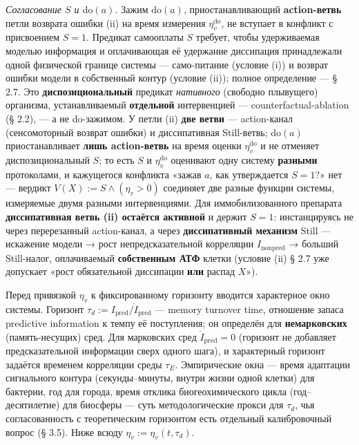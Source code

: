 \documentclass[pdflatex,sn-mathphys-ay]{sn-jnl}
\begin{document}
\emph{Согласование \(S\) и \(\mathrm{do}(a)\).} Зажим \(\mathrm{do}(a)\), приостанавливающий \textbf{action-ветвь} петли возврата ошибки (ii) на время измерения \(\eta_v^{\mathrm{do}}\), не вступает в конфликт с присвоением \(S = 1\). Предикат самооплаты \(S\) требует, чтобы удерживаемая моделью информация и оплачивающая её удержание диссипация принадлежали одной физической границе системы --- само-питание (условие (i)) и возврат ошибки модели в собственный контур (условие (ii)); полное определение --- § 2.7. Это \textbf{диспозициональный} предикат \emph{нативного} (свободно плывущего) организма, устанавливаемый \textbf{отдельной} интервенцией --- counterfactual-ablation (§ 2.2), --- а не do-зажимом. У петли (ii) \textbf{две ветви} --- action-канал (сенсомоторный возврат ошибки) и диссипативная Still-ветвь; \(\mathrm{do}(a)\) приостанавливает \textbf{лишь action-ветвь} на время оценки \(\eta_v^{\mathrm{do}}\) и не отменяет диспозициональный \(S\); то есть \(S\) и \(\eta_v^{\mathrm{do}}\) оценивают одну систему \textbf{разными} протоколами, и кажущегося конфликта «зажав \(a\), как утверждается \(S = 1\)?» нет --- вердикт \(V(X) := S \wedge (\eta_v > 0)\) соединяет две разные функции системы, измеряемые двумя разными интервенциями. Для иммобилизованного препарата \textbf{диссипативная ветвь (ii) остаётся активной} и держит \(S = 1\): инстанцируясь не через перерезанный action-канал, а через \textbf{диссипативный механизм} Still --- искажение модели → рост непредсказательной корреляции \(I_{\text{nonpred}}\) → больший Still-налог, оплачиваемый \textbf{собственным АТФ} клетки (условие (ii) § 2.7 уже допускает «рост обязательной диссипации \textbf{или} распад \(X\)»).

Перед привязкой \(\eta_v\) к фиксированному горизонту вводится характерное окно системы. Горизонт \(\tau_d := I_{\text{pred}}/\dot I_{\text{pred}}\) --- memory turnover time, отношение запаса predictive information к темпу её поступления; он определён для \textbf{немарковских} (память-несущих) сред. Для марковских сред \(\dot I_{\text{pred}} = 0\) (горизонт не добавляет предсказательной информации сверх одного шага), и характерный горизонт задаётся временем корреляции среды \(\tau_E\). Эмпирические окна --- время адаптации сигнального контура (секунды--минуты, внутри жизни одной клетки) для бактерии, год для города, время отклика биогеохимического цикла (год--десятилетие) для биосферы --- суть методологические прокси для \(\tau_d\), чья согласованность с теоретическим горизонтом есть отдельный калибровочный вопрос (§ 3.5). Ниже всюду \(\eta_v := \eta_v(t, \tau_d)\).
\end{document}
